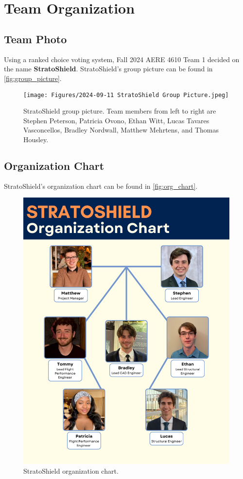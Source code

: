\chapter{Team Organization}\label{cp:team_org}

\section{Team Photo}

Using a ranked choice voting system, Fall 2024 AERE 4610 Team 1 decided on the name \textbf{StratoShield}. StratoShield's group picture can be found in \autoref{fig:group_picture}.

\begin{figure}[htpb]
    \centering
    \texttt{[image: Figures/2024-09-11 StratoShield Group Picture.jpeg]}
    \caption{StratoShield group picture. Team members from left to right are Stephen Peterson, Patricia Ovono, Ethan Witt, Lucas Tavares Vasconcellos, Bradley Nordwall, Matthew Mehrtens, and Thomas Housley.}
    \label{fig:group_picture}
\end{figure}

\section{Organization Chart}

StratoShield's organization chart can be found in \autoref{fig:org_chart}.

\begin{figure}[htpb]
    \centering
    \includegraphics[width=0.95\linewidth]{Figures/StratoShield Organization Chart v1.0.0.png}
    \caption{StratoShield organization chart.}
    \label{fig:org_chart}
\end{figure}